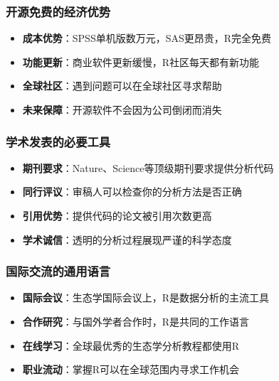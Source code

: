 \documentclass[
]{book}
\providecommand{\tightlist}{%
  \setlength{\itemsep}{0pt}\setlength{\parskip}{0pt}}
\begin{document}
\hypertarget{ux5f00ux6e90ux514dux8d39ux7684ux7ecfux6d4eux4f18ux52bf}{%
\subsubsection{开源免费的经济优势}\label{ux5f00ux6e90ux514dux8d39ux7684ux7ecfux6d4eux4f18ux52bf}}

\begin{itemize}
\tightlist
\item
  \textbf{成本优势}：SPSS单机版数万元，SAS更昂贵，R完全免费
\item
  \textbf{功能更新}：商业软件更新缓慢，R社区每天都有新功能
\item
  \textbf{全球社区}：遇到问题可以在全球社区寻求帮助
\item
  \textbf{未来保障}：开源软件不会因为公司倒闭而消失
\end{itemize}

\hypertarget{ux5b66ux672fux53d1ux8868ux7684ux5fc5ux8981ux5de5ux5177}{%
\subsubsection{学术发表的必要工具}\label{ux5b66ux672fux53d1ux8868ux7684ux5fc5ux8981ux5de5ux5177}}

\begin{itemize}
\tightlist
\item
  \textbf{期刊要求}：Nature、Science等顶级期刊要求提供分析代码
\item
  \textbf{同行评议}：审稿人可以检查你的分析方法是否正确
\item
  \textbf{引用优势}：提供代码的论文被引用次数更高
\item
  \textbf{学术诚信}：透明的分析过程展现严谨的科学态度
\end{itemize}

\hypertarget{ux56fdux9645ux4ea4ux6d41ux7684ux901aux7528ux8bedux8a00}{%
\subsubsection{国际交流的通用语言}\label{ux56fdux9645ux4ea4ux6d41ux7684ux901aux7528ux8bedux8a00}}

\begin{itemize}
\tightlist
\item
  \textbf{国际会议}：生态学国际会议上，R是数据分析的主流工具
\item
  \textbf{合作研究}：与国外学者合作时，R是共同的工作语言
\item
  \textbf{在线学习}：全球最优秀的生态学分析教程都使用R
\item
  \textbf{职业流动}：掌握R可以在全球范围内寻求工作机会
\end{itemize}
\end{document}
